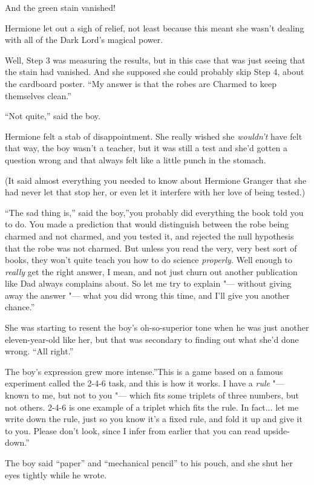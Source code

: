 And the green stain vanished!

Hermione let out a sigh of relief, not least because this meant she
wasn't dealing with all of the Dark Lord's magical power.

Well, Step 3 was measuring the results, but in this case that was just
seeing that the stain had vanished. And she supposed she could probably
skip Step 4, about the cardboard poster. ``My answer is that the robes
are Charmed to keep themselves clean.''

``Not quite,'' said the boy.

Hermione felt a stab of disappointment. She really wished she
\emph{wouldn't} have felt that way, the boy wasn't a teacher, but it was
still a test and she'd gotten a question wrong and that always felt like
a little punch in the stomach.

(It said almost everything you needed to know about Hermione Granger
that she had never let that stop her, or even let it interfere with her
love of being tested.)

``The sad thing is,'' said the boy,''you probably did everything the
book told you to do. You made a prediction that would distinguish
between the robe being charmed and not charmed, and you tested it, and
rejected the null hypothesis that the robe was not charmed. But unless
you read the very, very best sort of books, they won't quite teach you
how to do science \emph{properly}. Well enough to \emph{really} get the
right answer, I mean, and not just churn out another publication like
Dad always complains about. So let me try to explain "--- without giving
away the answer "--- what you did wrong this time, and I'll give you
another chance.''

She was starting to resent the boy's oh-so-superior tone when he was
just another eleven-year-old like her, but that was secondary to finding
out what she'd done wrong. ``All right.''

The boy's expression grew more intense.''This is a game based on a
famous experiment called the 2-4-6 task, and this is how it works. I
have a \emph{rule} "--- known to me, but not to you "--- which fits some
triplets of three numbers, but not others. 2-4-6 is one example of a
triplet which fits the rule. In fact... let me write down the rule,
just so you know it's a fixed rule, and fold it up and give it to you.
Please don't look, since I infer from earlier that you can read
upside-down.''

The boy said ``paper'' and ``mechanical pencil'' to his pouch, and she
shut her eyes tightly while he wrote.

